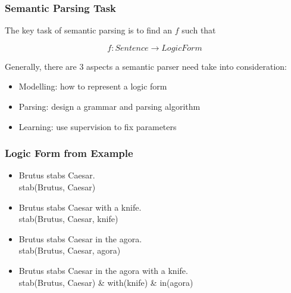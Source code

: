 \documentclass{beamer}
\begin{document}
\begin{frame}
    \frametitle{Semantic Parsing Task}

    The key task of semantic parsing is to find an $f$ such that

    \[
        f: Sentence \to LogicForm
    \]

    \pause

    Generally, there are 3 aspects a semantic parser need take into consideration:

    \begin{itemize}
        \item Modelling: how to represent a logic form
        \item Parsing: design a grammar and parsing algorithm
        \item Learning: use supervision to fix parameters
    \end{itemize}

\end{frame}

\begin{frame}
    \frametitle{Logic Form from Example}

    \begin{itemize}

        \item <2->
            Brutus stabs Caesar. \\
            stab(Brutus, Caesar) 

        \item <3->
            Brutus stabs Caesar with a knife. \\
            stab(Brutus, Caesar, \alert{knife}) 

        \item <4->
            Brutus stabs Caesar in the agora. \\
            stab(Brutus, Caesar, \alert{agora}) 

        \item <5->
            Brutus stabs Caesar in the agora with a knife. \\
            stab(Brutus, Caesar) \& \alert{with}(knife) \& \alert{in}(agora)

    \end{itemize}

\end{frame}
\end{document}
